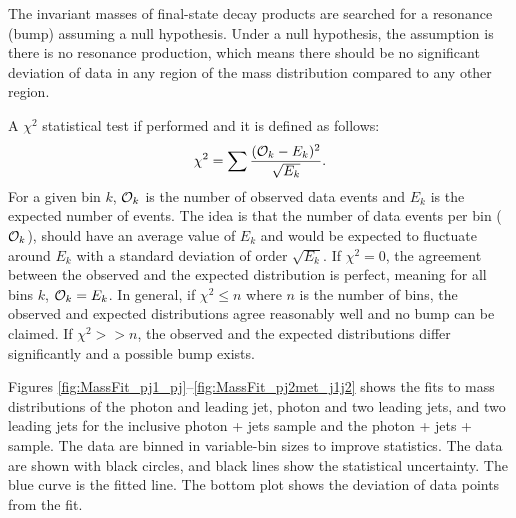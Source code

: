 The invariant masses of final-state decay products are searched for a resonance (bump) assuming a null hypothesis. Under a null hypothesis, the assumption is there is no resonance production, which means there should be no significant deviation of data in any region of the mass distribution compared to any other region.

A $\chi^{2}$ statistical test if performed and it is defined as follows:
\begin{equation}
 \chi^{2} = \sum \frac{({\cal O}_{k} - E_{k})^{2}}{\sqrt{E_{k}}}.
 \label{eqa:chi2Stat}
\end{equation}
For a given bin $k$, ${\cal O}_{k}$ is the number of observed data events and $E_{k}$ is the expected number of events. The idea is that the number of data events per bin (${\cal O}_{k}$), should have an average value of $E_{k}$ and would be expected to fluctuate around $E_{k}$ with a standard deviation of order $\sqrt{E_{k}}$. If $\chi^{2}=0$, the agreement between the observed and the expected distribution is perfect, meaning for all bins $k$, ${\cal O}_{k}=E_{k}$. In general, if $\chi^{2}\leq n$ where $n$ is the number of bins, the observed and expected distributions agree reasonably well and no bump can be claimed. If $\chi^{2}>>n$, the observed and the expected distributions differ significantly and a possible bump exists.

Figures \ref{fig:MassFit_pj1_pj}--\ref{fig:MassFit_pj2met_j1j2} shows the fits to mass distributions of the photon and leading jet, photon and two leading jets, and two leading jets for the inclusive photon + jets sample and the photon + jets +  sample. The data are binned in variable-bin sizes to improve statistics. The data are shown with black circles, and black lines show the statistical uncertainty. The blue curve is the fitted line. The bottom plot shows the deviation of data points from the fit.


